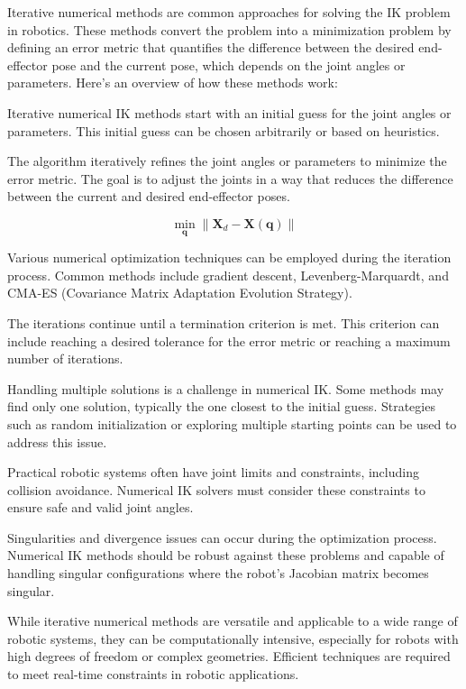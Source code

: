 Iterative numerical methods are common approaches for solving the IK problem in robotics. These methods convert the problem into a minimization problem by defining an error metric that quantifies the difference between the desired end-effector pose and the current pose, which depends on the joint angles or parameters. Here's an overview of how these methods work:

Iterative numerical IK methods start with an initial guess for the joint angles or parameters. This initial guess can be chosen arbitrarily or based on heuristics.

The algorithm iteratively refines the joint angles or parameters to minimize the error metric. The goal is to adjust the joints in a way that reduces the difference between the current and desired end-effector poses.

$$ \min_{\boldsymbol{q}} \left\| \boldsymbol{X}_d - \boldsymbol{X}(\boldsymbol{q}) \right\| $$

Various numerical optimization techniques can be employed during the iteration process. Common methods include gradient descent, Levenberg-Marquardt, and CMA-ES (Covariance Matrix Adaptation Evolution Strategy).

The iterations continue until a termination criterion is met. This criterion can include reaching a desired tolerance for the error metric or reaching a maximum number of iterations.

Handling multiple solutions is a challenge in numerical IK. Some methods may find only one solution, typically the one closest to the initial guess. Strategies such as random initialization or exploring multiple starting points can be used to address this issue.

Practical robotic systems often have joint limits and constraints, including collision avoidance. Numerical IK solvers must consider these constraints to ensure safe and valid joint angles.

Singularities and divergence issues can occur during the optimization process. Numerical IK methods should be robust against these problems and capable of handling singular configurations where the robot's Jacobian matrix becomes singular.

While iterative numerical methods are versatile and applicable to a wide range of robotic systems, they can be computationally intensive, especially for robots with high degrees of freedom or complex geometries. Efficient techniques are required to meet real-time constraints in robotic applications.


